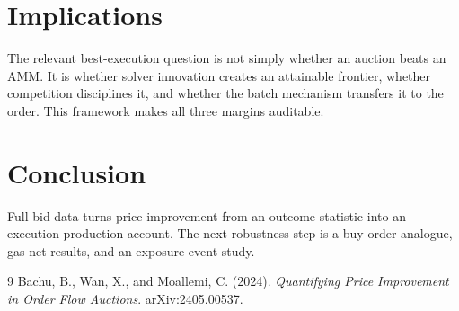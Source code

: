 \documentclass[11pt]{article}
\begin{document}
\section{Implications} The relevant best-execution question is not simply whether an auction beats an AMM.  It is whether solver innovation creates an attainable frontier, whether competition disciplines it, and whether the batch mechanism transfers it to the order.  This framework makes all three margins auditable.
\section{Conclusion} Full bid data turns price improvement from an outcome statistic into an execution-production account.  The next robustness step is a buy-order analogue, gas-net results, and an exposure event study.
\begin{thebibliography}{9} Bachu, B., Wan, X., and Moallemi, C. (2024). \emph{Quantifying Price Improvement in Order Flow Auctions}. arXiv:2405.00537.\end{thebibliography}
\end{document}
